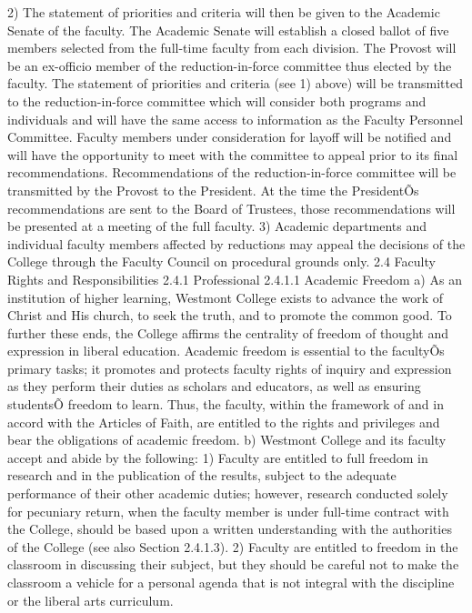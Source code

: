 \documentclass[letterpaper, 11pt]{article}
\begin{document}
2) The statement of priorities and criteria will then be given to the Academic Senate of the faculty.  The Academic Senate will establish a closed ballot of five members selected from the full-time faculty from each division.  The Provost will be an ex-officio member of the reduction-in-force committee thus elected by the faculty.  The statement of priorities and criteria (see 1) above) will be transmitted to the reduction-in-force committee which will consider both programs and individuals and will have the same access to information as the Faculty Personnel Committee.  Faculty members under consideration for layoff will be notified and will have the opportunity to meet with the committee to appeal prior to its final recommendations.  Recommendations of the reduction-in-force committee will be transmitted by the Provost to the President. At the time the PresidentÕs recommendations are sent to the Board of Trustees, those recommendations will be presented at a meeting of the full faculty.
3) Academic departments and individual faculty members affected by reductions may appeal the decisions of the College through the Faculty Council on procedural grounds only.
2.4 Faculty Rights and Responsibilities
2.4.1 Professional
2.4.1.1 Academic Freedom
a) As an institution of higher learning, Westmont College exists to advance the work of Christ and His church, to seek the truth, and to promote the common good.  To further these ends, the College affirms the centrality of freedom of thought and expression in liberal education.  Academic freedom is essential to the facultyÕs primary tasks; it promotes and protects faculty rights of inquiry and expression as they perform their duties as scholars and educators, as well as ensuring studentsÕ freedom to learn.  Thus, the faculty, within the framework of and in accord with the Articles of Faith, are entitled to the rights and privileges and bear the obligations of academic freedom.
b) Westmont College and its faculty accept and abide by the following:
1) Faculty are entitled to full freedom in research and in the publication of the results, subject to the adequate performance of their other academic duties; however, research conducted solely for pecuniary return, when the faculty member is under full-time contract with the College, should be based upon a written understanding with the authorities of the College (see also Section 2.4.1.3).
2) Faculty are entitled to freedom in the classroom in discussing their subject, but they should be careful not to make the classroom a vehicle for a personal agenda that is not integral with the discipline or the liberal arts curriculum.
\end{document}
